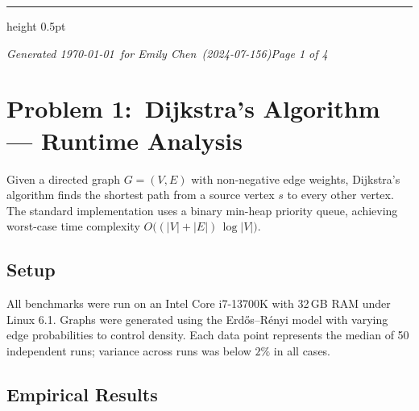 \documentclass[11pt,a4paper]{article}
\begin{document}
\vspace{18mm}

\begin{center}
\end{center}

\vfill
{\color{accentmid!45}\hrule height 0.5pt}
\vspace{3mm}
{\footnotesize\color{accentmid}\itshape Generated \today\ for Emily Chen\ (2024-07-156)\hfill Page 1 of 4}

\newpage


\section{Problem 1:\ Dijkstra's Algorithm --- Runtime Analysis}

Given a directed graph $G = (V, E)$ with non-negative edge weights, Dijkstra's algorithm finds
the shortest path from a source vertex $s$ to every other vertex. The standard implementation
uses a binary min-heap priority queue, achieving worst-case time complexity
$O\big((|V| + |E|)\,\log|V|\big)$.

\subsection{Setup}

All benchmarks were run on an Intel Core i7-13700K with 32\,GB RAM under Linux 6.1. Graphs were
generated using the Erd\H{o}s--R\'enyi model with varying edge probabilities to control density.
Each data point represents the median of 50 independent runs; variance across runs was below
$2\%$ in all cases.

\subsection{Empirical Results}
\end{document}
